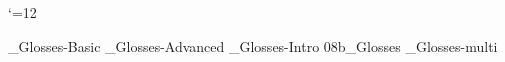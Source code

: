 


 \catcode`\@=12







%



  \bye

_Glosses-Basic
_Glosses-Advanced
%
\bye
{}_Glosses-Intro
\get 08b_Glosses
_Glosses-multi

